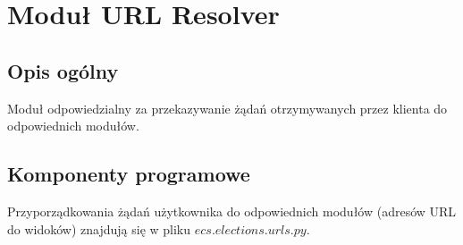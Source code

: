 \documentclass[pdflatex,11pt]{../aghdoc_version2}
\begin{document}
\section{Moduł URL Resolver}
\subsection{Opis ogólny}
Moduł odpowiedzialny za przekazywanie żądań otrzymywanych przez klienta do
odpowiednich modułów.

\subsection{Komponenty programowe}
Przyporządkowania żądań użytkownika do odpowiednich modułów (adresów URL do
widoków) znajdują się w pliku $ecs.elections.urls.py$.



\end{document}
